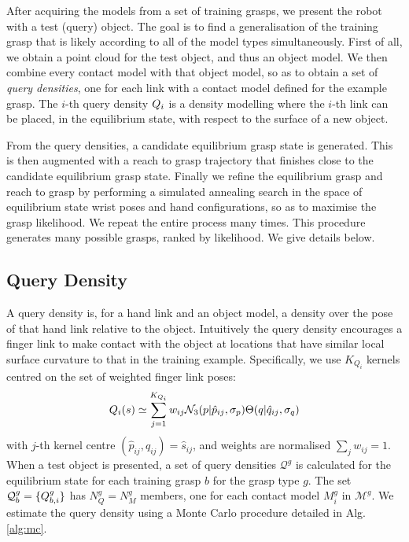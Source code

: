 
After acquiring the models from a set of training grasps, we present the robot with a test (query) object. The goal is to find a generalisation of the training grasp that is likely according to all of the model types simultaneously. First of all, we obtain a point cloud for the test object, and thus an object model. We then combine every contact model with that object model, so as to obtain a set of {\em query densities}, one for each link with a contact model defined for the example grasp. The $i$-th query density $Q_i$ is a density modelling where the $i$-th link can be placed, in the equilibrium state, with respect to the surface of a new object. 

From the query densities, a candidate equilibrium grasp state is generated. This is then augmented with a reach to grasp trajectory that finishes close to the candidate equilibrium grasp state. Finally we refine the equilibrium grasp and reach to grasp by performing a simulated annealing search in the space of equilibrium state wrist poses and hand configurations, so as to maximise the grasp likelihood. We repeat the entire process many times. This procedure generates many possible grasps, ranked by likelihood. We give details below.

\subsection{Query Density}

A query density is, for a hand link and an object model, a density over the pose of that hand link relative to the object. Intuitively the query density encourages a finger link to make contact with the object at locations that have similar local surface curvature to that in the training example. Specifically, we use $K_{Q_i}$ kernels centred on the set of weighted finger link poses:
\begin{equation}
\qd_i(s) \simeq \sum^{K_{Q_i}}_{j=1} w_{ij} \mathcal{N}_3(p|{\hat{p}_{ij}}, \sigma_{p}) \Theta(q|{\hat{q}_{ij}}, \sigma_{q})%
\label{eq:qd.approx}
\end{equation}
with $j$-th kernel centre $({\hat{p}_{ij}}, {\hat{q}_{ij}}) = \hat{s}_{ij}$, and weights are normalised $\sum_j w_{ij} = 1$. When a test object is presented, a set of query densities $\mathcal{Q}^g$ is calculated for the equilibrium state for each training grasp $b$ for the grasp type $g$. The set $\mathcal{Q}^g_b =\{Q_{b,i}^g\}$ has $N^g_Q=N^g_M$ members, one for each contact model $M_i^g$ in $\mathcal{M}^g$. We estimate the query density using a Monte Carlo procedure detailed in Alg.\ref{alg:mc}.

